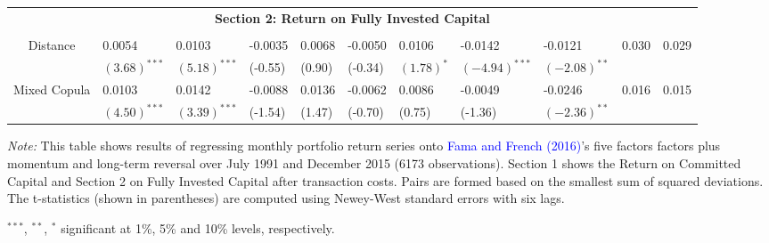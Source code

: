 \documentclass[a4paper]{article}
\begin{document}
\begin{table}[!ht]
\begin{threeparttable}[H]
\begin{tabularx}{\textwidth}{@{\extracolsep{\fill}} lllllllllll@{}}
				&       &       &       &       &       &       &       &       &       &       \\
				\midrule
				\multicolumn{11}{c}{\textbf{Section 2: Return on Fully Invested Capital}} \\
				&       &       &       &       &       &       &       &       &       &    \\
				\multicolumn{1}{c}{Distance} & 0.0054 & 0.0103 & -0.0035 & 0.0068 & -0.0050 & 0.0106 & -0.0142 & -0.0121 & 0.030 & 0.029 \\
				\multicolumn{1}{c}{} & $(3.68)^{***}$ & $(5.18)^{***}$ & (-0.55) & (0.90) & (-0.34) & $(1.78)^{*}$ & $(-4.94)^{***}$ & $(-2.08)^{**}$ & & \\
				\multicolumn{1}{c}{Mixed Copula} & 0.0103 & 0.0142 & -0.0088 & 0.0136 & -0.0062 & 0.0086 & -0.0049 & -0.0246 & 0.016 & 0.015 \\
				\multicolumn{1}{c}{} & $(4.50)^{***}$ & $(3.39)^{***}$ & (-1.54) & (1.47) & (-0.70) & (0.75) & (-1.36) & $(-2.36)^{**}$ & & \\
				\bottomrule
			\end{tabularx}
			\begin{tablenotes}
				\item \textit{Note:} \tiny  This table shows results of regressing monthly portfolio return series onto \textcolor{blue}{Fama and French} \textcolor{blue}{(2016)}'s five factors factors plus momentum and long-term reversal over July 1991 and December 2015 (6173 observations). Section 1 shows the Return on Committed Capital and Section 2 on Fully Invested Capital after transaction costs. Pairs are formed based on the smallest sum of squared deviations. The t-statistics (shown in parentheses) are computed using Newey-West standard errors with six lags.
				\item \footnotesize $^{\ast\ast\ast}$, $^{\ast\ast}$, $^{\ast}$  significant at 1\%, 5\% and 10\% levels, respectively.
			\end{tablenotes}
		\end{threeparttable}%
		\label{tab:table104}%
	\end{table}%

\vspace{0.6cm}
\end{document}

